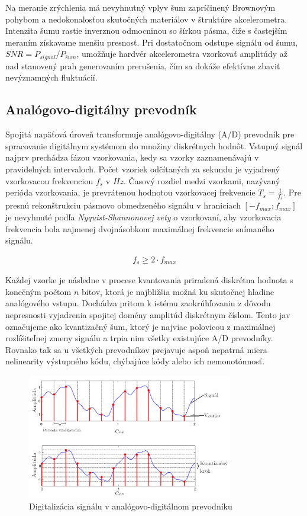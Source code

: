 Na meranie zrýchlenia má nevyhnutný vplyv šum zapríčinený Brownovým  pohybom a nedokonalosťou skutočných materiálov v štruktúre 
akcelerometra. Intenzita šumu rastie inverznou odmocninou so šírkou pásma, čiže s častejším meraním získavame menšiu presnosť. Pri 
dostatočnom odstupe signálu od šumu, $SNR = P_{signal} / P_{šum}$, umožňuje hardvér akcelerometra vzorkovať amplitúdy až nad stanovený 
prah generovaním prerušenia, čím sa dokáže efektívne zbaviť nevýznamných fluktuácií.

\subsection{Analógovo-digitálny prevodník}
Spojitá napäťová úroveň transformuje analógovo-digitálny (A/D) prevodník pre spracovanie digitálnym systémom do množiny diskrétnych
hodnôt. Vstupný signál najprv prechádza fázou vzorkovania, kedy sa vzorky zaznamenávajú v pravidelných intervaloch. Počet vzoriek
odčítaných za sekundu je vyjadrený vzorkovacou frekvenciou $f_s$ v $Hz$. Časový rozdiel medzi vzorkami, nazývaný perióda vzorkovania,
je prevrátenou hodnotou vzorkovacej frekvencie $T_s = \frac{1}{f_s}$. Pre presnú rekonštrukciu pásmovo obmedzeného signálu v hraniciach
$[-f_{max}; f_{max}]$ je nevyhnuté podľa \emph{Nyquist-Shannonovej vety} o vzorkovaní, aby vzorkovacia frekvencia bola najmenej 
dvojnásobkom maximálnej frekvencie snímaného signálu.
\begin{ceqn}\begin{align}
   f_s \geq 2 \cdot f_{max}
\end{align}\end{ceqn}

Každej vzorke je následne v procese kvantovania priradená diskrétna hodnota s konečným počtom $n$ bitov, ktorá je najbližšia možná ku
skutočnej hladine analógového vstupu. Dochádza pritom k istému zaokrúhľovaniu z dôvodu nepresnosti vyjadrenia spojitej domény amplitúd
diskrétnym číslom. Tento jav označujeme ako kvantizačný šum, ktorý je najviac polovicou z maximálnej rozlíšiteľnej zmeny signálu a
trpia nim všetky existujúce A/D prevodníky. Rovnako tak sa u všetkých prevodníkov prejavuje aspoň nepatrná miera nelinearity výstupného
kódu, chýbajúce kódy alebo ich nemonotónnosť.

\begin{figure}[h]
	\centering
	\includegraphics[width=0.8\textwidth]{figures/analog-to-digital-conversion.png}
	\caption{Digitalizácia signálu v analógovo-digitálnom prevodníku \cite{music-processing}}
\end{figure}

